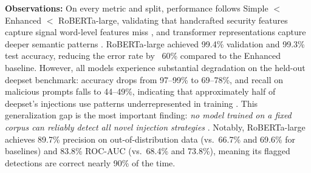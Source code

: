 \documentclass[12pt, letterpaper]{article}   %
\begin{document}
\begin{table}[h!]
    \centering
    \renewcommand{\arraystretch}{1.5}
    \small
    \caption{Consolidated performance comparison of all three detector models across all evaluation splits (values in \%).}
    \label{tab:conclusion_comparison}
\end{table}

\textbf{Observations:} On every metric and split, performance follows Simple $<$ Enhanced $<$ RoBERTa-large, validating that handcrafted security features capture signal word-level features miss \cite{ref7}, and transformer representations capture deeper semantic patterns \cite{ref37}\cite{ref33}. RoBERTa-large achieved 99.4\% validation and 99.3\% test accuracy, reducing the error rate by ~60\% compared to the Enhanced baseline. However, all models experience substantial degradation on the held-out deepset benchmark: accuracy drops from 97--99\% to 69--78\%, and recall on malicious prompts falls to 44--49\%, indicating that approximately half of deepset's injections use patterns underrepresented in training \cite{ref10}\cite{ref3}. This generalization gap is the most important finding: \textit{no model trained on a fixed corpus can reliably detect all novel injection strategies} \cite{ref4}. Notably, RoBERTa-large achieves 89.7\% precision on out-of-distribution data (vs.\ 66.7\% and 69.6\% for baselines) and 83.8\% ROC-AUC (vs.\ 68.4\% and 73.8\%), meaning its flagged detections are correct nearly 90\% of the time.
\end{document}
